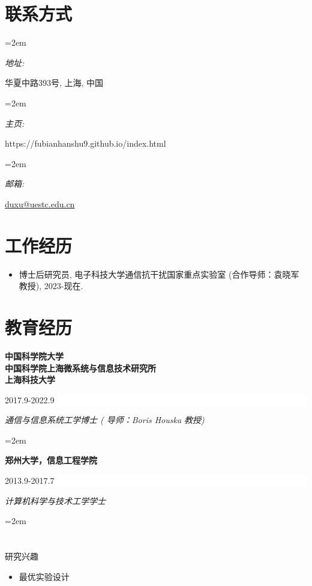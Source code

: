 \documentclass[paper=a4,fontsize=11pt]{scrartcl} %
\newlength{\spacebox}
\newcommand{\sepspace}{\vspace*{1em}}		%
\newcommand{\MyName}[1]{ %
		\Huge \usefont{OT1}{phv}{b}{n} \hfill #1
		\par \normalsize \normalfont}
\newcommand{\MySlogan}[1]{ %
		\large \usefont{OT1}{phv}{m}{n}\hfill \textit{#1}
		\par \normalsize \normalfont}
\newcommand{\NewPart}[1]{\section*{\uppercase{#1}}}
\newcommand{\PersonalEntry}[2]{
		\noindent\hangindent=2em\hangafter=0 %
		\parbox{\spacebox}{        %
		\textit{#1}}		       %
		\hspace{1.5em} #2 \par}    %
\newcommand{\EducationEntry}[4]{
		\noindent \textbf{#1} \hfill      %
		\colorbox{White}{%
			\parbox{5cm}{%
			\hfill\color{Black}#2}} \par  %
		\noindent \textit{#3} \par        %
		\noindent\hangindent=2em\hangafter=0 \small #4 %
		\normalsize \par}
\begin{document}
		\begin{CJK*}{UTF8}{gbsn}
{
	\par \normalsize \normalfont}


\NewPart{联系方式}{}

\PersonalEntry{地址:}{ 华夏中路393号, 上海, 中国}
\PersonalEntry{主页:}{https://fubianhanshu9.github.io/index.html}
\PersonalEntry{邮箱:}{\url{duxu@uestc.edu.cn}}%

\NewPart{工作经历}
\begin{itemize}
	\item 博士后研究员, 电子科技大学通信抗干扰国家重点实验室  (合作导师：袁晓军教授), 2023-现在.
\end{itemize}

\NewPart{教育经历}{}

\EducationEntry{中国科学院大学\\中国科学院上海微系统与信息技术研究所\\上海科技大学}{2017.9-2022.9}{通信与信息系统工学博士 ( 导师：Boris Houska 教授) }

\sepspace

\EducationEntry{郑州大学，信息工程学院}{2013.9-2017.7}{计算机科学与技术工学学士 }

\NewPart{研究兴趣}{}
\begin{itemize}
	\item{最优实验设计}
	

\end{itemize}
\end{CJK*}
\end{document}
